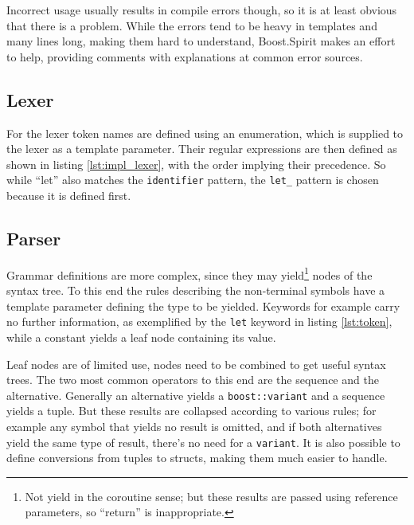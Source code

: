 		Incorrect usage usually results in compile errors though, so it is at least obvious that there is a problem. While the errors tend to be heavy in templates and many lines long, making them hard to understand, Boost.Spirit makes an effort to help, providing comments with explanations at common error sources.
		
		\subsection{Lexer}
				
		For the lexer token names are defined using an enumeration, which is supplied to the lexer as a template parameter. Their regular expressions are then defined as shown in listing \ref{lst:impl_lexer}, with the order implying their precedence. So while ``let'' also matches the \lstinline$identifier$ pattern, the \lstinline$let_$ pattern is chosen because it is defined first.
		
		
		
		\subsection{Parser}
		
		Grammar definitions are more complex, since they may yield\footnote{Not yield in the coroutine sense; but these results are passed using reference parameters, so ``return'' is inappropriate.} nodes of the syntax tree. To this end the rules describing the non-terminal symbols have a template parameter defining the type to be yielded. Keywords for example carry no further information, as exemplified by the \lstinline$let$ keyword in listing \ref{lst:token}, while a constant yields a leaf node containing its value.
		
		
		Leaf nodes are of limited use, nodes need to be combined to get useful syntax trees. The two most common operators to this end are the sequence and the alternative. Generally an alternative yields a \lstinline$boost::variant$ and a sequence yields a tuple. But these results are collapsed according to various rules\cite{spirit_attributes}; for example any symbol that yields no result is omitted, and if both alternatives yield the same type of result, there's no need for a \lstinline$variant$. It is also possible to define conversions from tuples to structs, making them much easier to handle.
		
